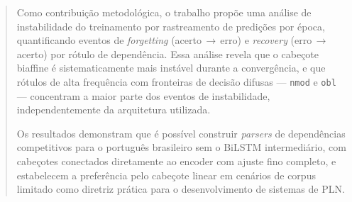 \begin{abstract}
Como contribuição metodológica, o trabalho propõe uma análise de instabilidade do treinamento
por rastreamento de predições por época, quantificando eventos de \textit{forgetting}
(acerto\,$\to$\,erro) e \textit{recovery} (erro\,$\to$\,acerto) por rótulo de dependência.
Essa análise revela que o cabeçote biaffine é sistematicamente mais instável durante a
convergência, e que rótulos de alta frequência com fronteiras de decisão difusas ---
\texttt{nmod} e \texttt{obl} --- concentram a maior parte dos eventos de instabilidade,
independentemente da arquitetura utilizada.

Os resultados demonstram que é possível construir \textit{parsers} de dependências competitivos
para o português brasileiro sem o BiLSTM intermediário, com cabeçotes conectados diretamente
ao encoder com ajuste fino completo, e estabelecem a preferência pelo cabeçote linear em
cenários de corpus limitado como diretriz prática para o desenvolvimento de sistemas de PLN.

\end{abstract}

